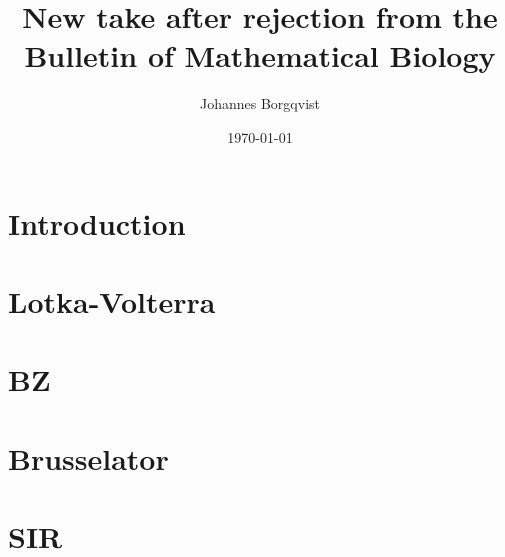 \documentclass[12pt]{article}
\begin{document}
\title{\textbf{New take after rejection from the Bulletin of Mathematical Biology}}
\author{Johannes Borgqvist}
\date{\today}
\maketitle
\tableofcontents
\clearpage
\section{Introduction}

\section{Lotka-Volterra}

\section{BZ}

\section{Brusselator}

\section{SIR}

\end{document}
